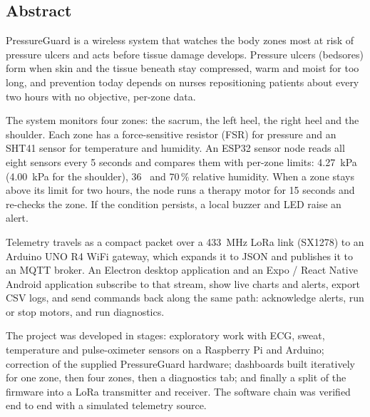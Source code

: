 \begin{flushright}
\huge{\section*{Abstract}}
\end{flushright}
PressureGuard is a wireless system that watches the body zones most at risk of pressure ulcers and acts before tissue damage develops. Pressure ulcers (bedsores) form when skin and the tissue beneath stay compressed, warm and moist for too long, and prevention today depends on nurses repositioning patients about every two hours with no objective, per-zone data.

The system monitors four zones: the sacrum, the left heel, the right heel and the shoulder. Each zone has a force-sensitive resistor (FSR) for pressure and an SHT41 sensor for temperature and humidity. An ESP32 sensor node reads all eight sensors every 5 seconds and compares them with per-zone limits: 4.27~kPa (4.00~kPa for the shoulder), 36~\degC{} and 70\,\% relative humidity. When a zone stays above its limit for two hours, the node runs a therapy motor for 15 seconds and re-checks the zone. If the condition persists, a local buzzer and LED raise an alert.

Telemetry travels as a compact packet over a 433~MHz LoRa link (SX1278) to an Arduino UNO R4 WiFi gateway, which expands it to JSON and publishes it to an MQTT broker. An Electron desktop application and an Expo / React Native Android application subscribe to that stream, show live charts and alerts, export CSV logs, and send commands back along the same path: acknowledge alerts, run or stop motors, and run diagnostics.

The project was developed in stages: exploratory work with ECG, sweat, temperature and pulse-oximeter sensors on a Raspberry Pi and Arduino; correction of the supplied PressureGuard hardware; dashboards built iteratively for one zone, then four zones, then a diagnostics tab; and finally a split of the firmware into a LoRa transmitter and receiver. The software chain was verified end to end with a simulated telemetry source.


\clearpage
